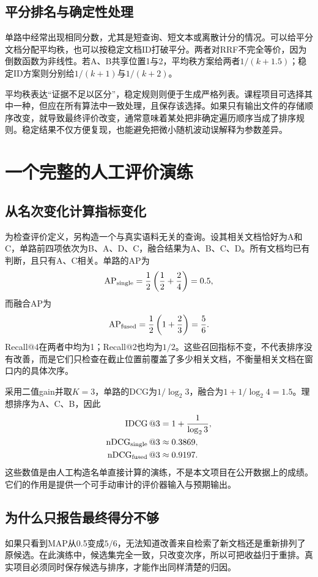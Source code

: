 \documentclass[sigconf,nonacm]{acmart}
\newcommand{\AP}{\operatorname{AP}}
\begin{document}
\subsection{平分排名与确定性处理}
单路中经常出现相同分数，尤其是短查询、短文本或离散计分的情况。可以给平分文档分配平均秩，也可以按稳定文档ID打破平分。两者对RRF不完全等价，因为倒数函数为非线性。若A、B共享位置1与2，平均秩方案给两者$1/(k+1.5)$；稳定ID方案则分别给$1/(k+1)$与$1/(k+2)$。

平均秩表达“证据不足以区分”，稳定规则则便于生成严格列表。课程项目可选择其中一种，但应在所有算法中一致处理，且保存该选择。如果只有输出文件的存储顺序改变，就导致最终评价改变，通常意味着某处把非确定遍历顺序当成了排序规则。稳定结果不仅方便复现，也能避免把微小随机波动误解释为参数差异。

\section{一个完整的人工评价演练}
\subsection{从名次变化计算指标变化}
为检查评价定义，另构造一个与真实语料无关的查询。设其相关文档恰好为A和C，单路前四项依次为B、A、D、C，融合结果为A、B、C、D。所有文档均已有判断，且只有A、C相关。单路的AP为
\begin{equation}
 \AP_{\rm single}=\frac12\left(\frac12+\frac24\right)=0.5,
\end{equation}
而融合AP为
\begin{equation}
 \AP_{\rm fused}=\frac12\left(1+\frac23\right)=\frac56.
\end{equation}
Recall@4在两者中均为1；Recall@2也均为$1/2$。这些召回指标不变，不代表排序没有改善，而是它们只检查在截止位置前覆盖了多少相关文档，不衡量相关文档在窗口内的具体次序。

采用二值gain并取$K=3$，单路的DCG为$1/\log_2 3$，融合为$1+1/\log_2 4=1.5$。理想排序为A、C、B，因此
\begin{align}
 \operatorname{IDCG}@3&=1+\frac1{\log_2 3},\\
 \operatorname{nDCG}_{\rm single}@3&\approx0.3869,\\
 \operatorname{nDCG}_{\rm fused}@3&\approx0.9197.
\end{align}
这些数值是由人工构造名单直接计算的演练，不是本文项目在公开数据上的成绩。它们的作用是提供一个可手动审计的评价器输入与预期输出。

\subsection{为什么只报告最终得分不够}
如果只看到MAP从0.5变成$5/6$，无法知道改善来自检索了新文档还是重新排列了原候选。在此演练中，候选集完全一致，只改变次序，所以可把收益归于重排。真实项目必须同时保存候选与排序，才能作出同样清楚的归因。
\end{document}
